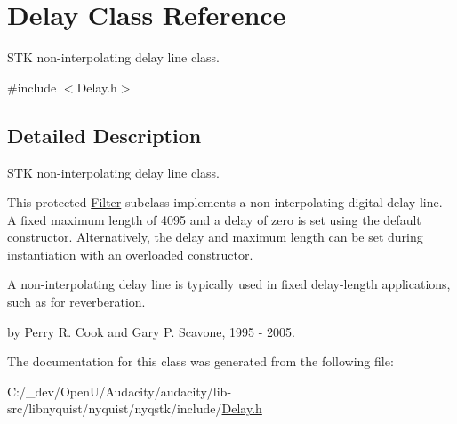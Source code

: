 \hypertarget{class_delay}{}\section{Delay Class Reference}
\label{class_delay}


S\+TK non-\/interpolating delay line class.  




{\ttfamily \#include $<$Delay.\+h$>$}



\subsection{Detailed Description}
S\+TK non-\/interpolating delay line class. 

This protected \hyperlink{class_filter}{Filter} subclass implements a non-\/interpolating digital delay-\/line. A fixed maximum length of 4095 and a delay of zero is set using the default constructor. Alternatively, the delay and maximum length can be set during instantiation with an overloaded constructor.

A non-\/interpolating delay line is typically used in fixed delay-\/length applications, such as for reverberation.

by Perry R. Cook and Gary P. Scavone, 1995 -\/ 2005. 

The documentation for this class was generated from the following file\+:\begin{DoxyCompactItemize}
\item 
C\+:/\+\_\+dev/\+Open\+U/\+Audacity/audacity/lib-\/src/libnyquist/nyquist/nyqstk/include/\hyperlink{_delay_8h}{Delay.\+h}\end{DoxyCompactItemize}
